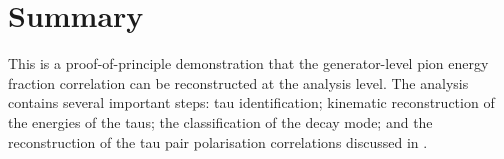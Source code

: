 \section{Summary}
This is a proof-of-principle demonstration that the generator-level pion energy fraction correlation can be reconstructed at the analysis level. The analysis contains several important steps: tau identification; kinematic reconstruction of the energies of the taus; the classification of the  \tauToPionBoth decay mode; and the reconstruction of the tau pair polarisation correlations discussed in .











